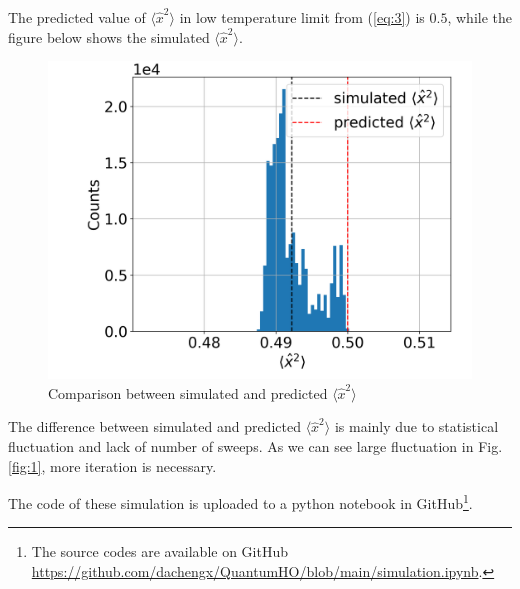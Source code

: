 The predicted value of $\langle\hat{x}^2\rangle$ in low temperature limit from (\ref{eq:3}) is $0.5$, while the figure below shows the simulated $\langle\hat{x}^2\rangle$.

\begin{figure}
    \centering
    \includegraphics[width=0.6\linewidth]{figures/x2_hist.png}
    \caption{Comparison between simulated and predicted $\langle\hat{x}^2\rangle$}
\end{figure}

The difference between simulated and predicted $\langle\hat{x}^2\rangle$ is mainly due to statistical fluctuation and lack of number of sweeps. As we can see large fluctuation in Fig. \ref{fig:1}, more iteration is necessary. 

The code of these simulation is uploaded to a python notebook in GitHub\footnote{The source codes are available on GitHub \url{https://github.com/dachengx/QuantumHO/blob/main/simulation.ipynb}.}.
